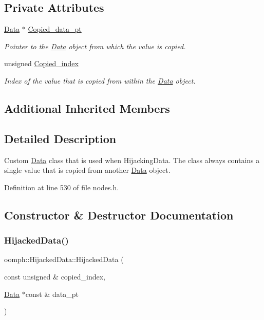 \subsection*{Private Attributes}
\begin{DoxyCompactItemize}
\item 
\hyperlink{classoomph_1_1Data}{Data} $\ast$ \hyperlink{classoomph_1_1HijackedData_a19ec740b0ea8dc8cafc5aff3836a01cb}{Copied\+\_\+data\+\_\+pt}
\begin{DoxyCompactList}\small\item\em Pointer to the \hyperlink{classoomph_1_1Data}{Data} object from which the value is copied. \end{DoxyCompactList}\item 
unsigned \hyperlink{classoomph_1_1HijackedData_ac033302cfc0833e251501eae1e10001f}{Copied\+\_\+index}
\begin{DoxyCompactList}\small\item\em Index of the value that is copied from within the \hyperlink{classoomph_1_1Data}{Data} object. \end{DoxyCompactList}\end{DoxyCompactItemize}
\subsection*{Additional Inherited Members}


\subsection{Detailed Description}
Custom \hyperlink{classoomph_1_1Data}{Data} class that is used when Hijacking\+Data. The class always contains a single value that is copied from another \hyperlink{classoomph_1_1Data}{Data} object. 

Definition at line 530 of file nodes.\+h.



\subsection{Constructor \& Destructor Documentation}
\mbox{\label{classoomph_1_1HijackedData_a7c9c9735ad6199fdf2e9a341559d45cc}} 
\subsubsection{\texorpdfstring{Hijacked\+Data()}{HijackedData()}\hspace{0.1cm}{\footnotesize\ttfamily [1/2]}}
{\footnotesize\ttfamily oomph\+::\+Hijacked\+Data\+::\+Hijacked\+Data (\begin{DoxyParamCaption}\item[{const unsigned \&}]{copied\+\_\+index,  }\item[{\hyperlink{classoomph_1_1Data}{Data} $\ast$const \&}]{data\+\_\+pt }\end{DoxyParamCaption})}



